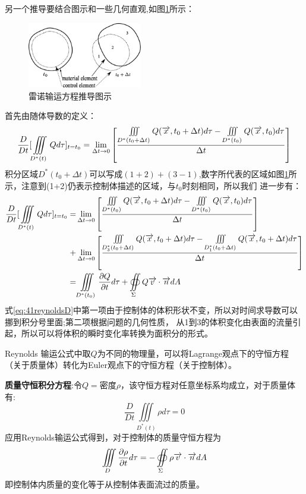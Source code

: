 另一个推导要结合图示和一些几何直观,如图\ref{fig:412}所示：

\begin{figure}[!ht]
\centering
\includegraphics[width=5cm]{reynolds_derivation_illustration.eps}
\caption{雷诺输运方程推导图示}\label{fig:412}
\end{figure}
首先由随体导数的定义：
\begin{equation}
\frac{D}{Dt}[\iiint\limits_{D^*(t)}Qd\tau]_{t=t_0}=\lim_{\Delta t \to 0} \left[\frac{\iiint\limits_{D^*(t_0+\Delta t)}Q(\overrightarrow{x},t_0+\Delta t) d\tau - \iiint\limits_{D^*(t_0)} Q(\overrightarrow{x},t_0) d\tau  }{\Delta t}\right]
\end{equation}
积分区域$D^*(t_0+\Delta t)$可以写成$(1+2)+(3-1)$,数字所代表的区域如图\ref{fig:412}所示，注意到(1+2)仍表示控制体描述的区域，与$t_0$时刻相同，所以我们
进一步有：
\begin{align}\label{eq:41reynoldsD}
\frac{D}{Dt}[\iiint\limits_{D^*(t)}Qd\tau]_{t=t_0}=&\lim_{\Delta t \to 0} \left[
\frac{\iiint\limits_{D^*(t_0)}Q(\overrightarrow{x},t_0+\Delta t) d\tau - \iiint\limits_{D^*(t_0)} Q(\overrightarrow{x},t_0) d\tau  }{\Delta t}
\right]\nonumber\\
+&\lim_{\Delta t \to 0}\left[\frac{\iiint\limits_{D^*_3(t_0+\Delta t)}Q(\overrightarrow{x},t_0+\Delta t) d\tau - \iiint\limits_{D^*_1(t_0+\Delta t)} Q(\overrightarrow{x},t_0+\Delta t) d\tau  }{\Delta t}
\right]\nonumber\\
=& \iiint\limits_{D^*(t_0)}\frac{\partial Q}{\partial t} d\tau + \oiint\limits_{\Sigma} Q\overrightarrow{v} \cdot \overrightarrow{n} dA
\end{align}
式\eqref{eq:41reynoldsD}中第一项由于控制体的体积形状不变，所以对时间求导数可以挪到积分号里面;第二项根据问题的几何性质，
从1到3的体积变化由表面的流量引起，所以可以将体积的瞬时变化率转换为面积分的形式。

Reynolds 输运公式中取$Q$为不同的物理量，可以将Lagrange观点下的守恒方程（关于质量体）转化为Euler观点下的守恒方程（关于控制体）。

\textbf{质量守恒积分方程}:令$Q=$密度$\rho$，该守恒方程对任意坐标系均成立，对于质量体有:
\begin{equation}
\frac{D}{Dt} \iiint\limits_{D^*(t)}\rho d\tau =0
\end{equation}
应用Reynolds输运公式得到，对于控制体的质量守恒方程为
\begin{equation}
\iiint\limits_{D}\frac{\partial \rho}{\partial t} d\tau = - \oiint\limits_{\Sigma} \rho \overrightarrow{v}\cdot \overrightarrow{n} dA
\end{equation}
即控制体内质量的变化等于从控制体表面流过的质量。

